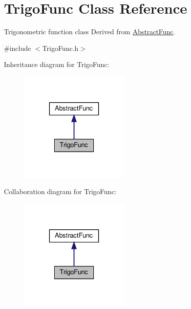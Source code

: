 \hypertarget{classTrigoFunc}{}\section{Trigo\+Func Class Reference}
\label{classTrigoFunc}


Trigonometric function class Derived from \hyperlink{classAbstractFunc}{Abstract\+Func}.  




{\ttfamily \#include $<$Trigo\+Func.\+h$>$}



Inheritance diagram for Trigo\+Func\+:\nopagebreak
\begin{figure}[H]
\begin{center}
\leavevmode
\includegraphics[width=155pt]{classTrigoFunc__inherit__graph}
\end{center}
\end{figure}


Collaboration diagram for Trigo\+Func\+:\nopagebreak
\begin{figure}[H]
\begin{center}
\leavevmode
\includegraphics[width=155pt]{classTrigoFunc__coll__graph}
\end{center}
\end{figure}
